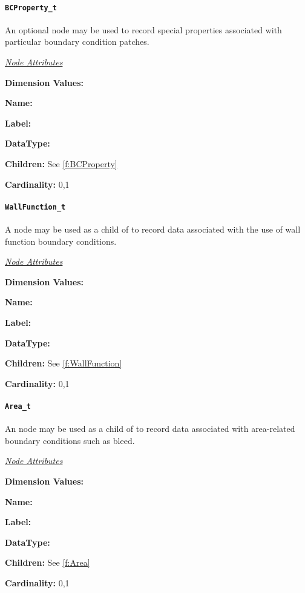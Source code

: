 \paragraph{\texttt{BCProperty\_t}}

An optional  node may be used to record special
properties associated with particular boundary condition patches.

\textit{\uline{Node Attributes}}
\begin{Ventryic}{\textbf{Dimension Values:}}
\item [\textbf{Name:}]
\item [\textbf{Label:}]
\item [\textbf{DataType:}]
\item [\textbf{Children:}]
      See \autoref{f:BCProperty}
\item [\textbf{Cardinality:}]
      0,1
\end{Ventryic}

\paragraph{\texttt{WallFunction\_t}}

A  node may be used as a child of
 to record data associated with the use of wall
function boundary conditions.

\textit{\uline{Node Attributes}}
\begin{Ventryic}{\textbf{Dimension Values:}}
\item [\textbf{Name:}]
\item [\textbf{Label:}]
\item [\textbf{DataType:}]
\item [\textbf{Children:}]
      See \autoref{f:WallFunction}
\item [\textbf{Cardinality:}]
      0,1
\end{Ventryic}

\paragraph{\texttt{Area\_t}}

An  node may be used as a child of 
to record data associated with area-related boundary conditions such as
bleed.

\textit{\uline{Node Attributes}}
\begin{Ventryic}{\textbf{Dimension Values:}}
\item [\textbf{Name:}]
\item [\textbf{Label:}]
\item [\textbf{DataType:}]
\item [\textbf{Children:}]
      See \autoref{f:Area}
\item [\textbf{Cardinality:}]
      0,1
\end{Ventryic}

